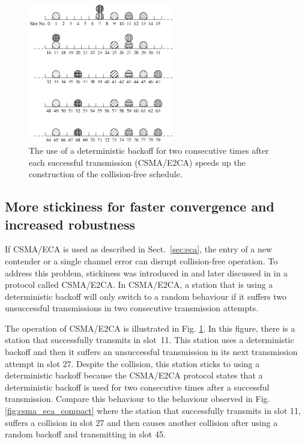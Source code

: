 \documentclass[journal]{IEEEtran}
\begin{document}
\begin{figure}[!t]
\centering
\includegraphics[width=2.5in]{figures/csma_e2ca}
\caption{The use of a deterministic backoff for two consecutive times after each successful transmission (CSMA/E2CA) speeds up the construction of the collision-free schedule.}
\label{fig:csma_e2ca}
\end{figure}



\subsection{More stickiness for faster convergence and increased robustness}
If CSMA/ECA is used as described in Sect.~\ref{sec:eca}, the entry of a new contender or a single channel error can disrupt collision-free operation.
To address this problem, stickiness was introduced in \cite{fang2011dlm} and later discussed in \cite{barcelo2011tcf} in a protocol called CSMA/E2CA.
In CSMA/E2CA, a station that is using a deterministic backoff will only switch to a random behaviour if it suffers two unsuccessful transmissions in two consecutive transmission attempts.

The operation of CSMA/E2CA is illustrated in Fig. \ref{fig:csma_e2ca}.
In this figure, there is a station that successfully transmits in slot~11.
This station uses a deterministic backoff and then it suffers an unsuccessful  transmission in its next transmission attempt in slot 27.
Despite the collision, this station sticks to using a deterministic backoff because the CSMA/E2CA protocol states that a deterministic backoff is used for two consecutive times after a successful transmission.
Compare this behaviour to the behaviour observed in Fig. \ref{fig:csma_eca_compact} where the station that successfully transmits in slot 11, suffers a collision in slot 27 and then causes another collision after using a random backoff and transmitting in slot 45.
\end{document}
